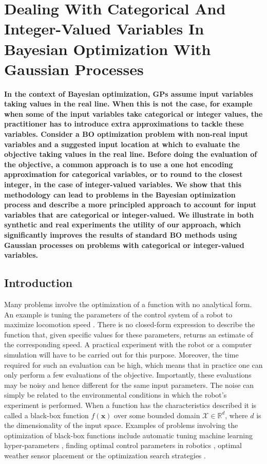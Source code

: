 
\chapter{Dealing With Categorical And Integer-Valued Variables In Bayesian Optimization With Gaussian Processes} %
\label{Chapter6}

{\bf \small{
In the context of Bayesian optimization, GPs assume input variables taking values in the real line. When this is not the case, for example when some of the input variables take categorical or integer values, the practitioner has to introduce extra approximations to tackle these variables.
Consider a BO optimization problem with non-real input variables and a suggested input location at which to evaluate the objective taking values in the real line.
Before doing the evaluation of the objective, a common approach
is to use a one hot encoding approximation for categorical variables, or to round to the closest
integer, in the case of integer-valued variables. We show that this methodology can lead to problems
in the Bayesian optimization process and describe a more principled approach to account for input
variables that are categorical or integer-valued. We illustrate in both synthetic and real
experiments the utility of our approach, which significantly improves the results of
standard BO methods using Gaussian processes on problems with categorical or integer-valued
variables.
}}

\section{Introduction}
Many problems involve the optimization of a function with no analytical form. 
An example is tuning the parameters of the control system of a robot to maximize locomotion
speed \citep{lizotte2007automatic}. There is no closed-form expression to describe the 
function that, given specific values for these parameters, returns an estimate of the corresponding 
speed. A practical experiment with the robot or a computer simulation will 
have to be carried out for this purpose. Moreover, the time required for such an evaluation
can be high, which means that in practice one can only perform a few evaluations of the objective. 
Importantly, these evaluations may be noisy and hence different 
for the same input parameters. The noise can simply be related to the 
environmental conditions in which the robot's experiment is performed. 
When a function has the characteristics described it is called a black-box function $f(\mathbf{x})$ over 
some bounded domain $\mathcal{X} \in \mathds{R}^d$, where $d$ is the dimensionality
of the input space. Examples of problems involving the optimization of black-box functions include automatic 
tuning machine learning hyper-parameters \citep{snoek2013}, finding optimal control parameters in 
robotics \citep{lizotte2007automatic}, optimal weather sensor placement \citep{garnett2010bayesian} or 
the optimization search strategies \citep{cornejo2018Bayesian}.


